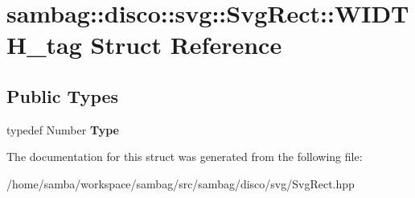 \hypertarget{structsambag_1_1disco_1_1svg_1_1_svg_rect_1_1_w_i_d_t_h__tag}{
\section{sambag::disco::svg::SvgRect::WIDTH\_\-tag Struct Reference}
\label{structsambag_1_1disco_1_1svg_1_1_svg_rect_1_1_w_i_d_t_h__tag}
}
\subsection*{Public Types}
\begin{DoxyCompactItemize}
\item 
\hypertarget{structsambag_1_1disco_1_1svg_1_1_svg_rect_1_1_w_i_d_t_h__tag_acd340385d4aaca2bf015edb751d585cd}{
typedef Number {\bfseries Type}}
\label{structsambag_1_1disco_1_1svg_1_1_svg_rect_1_1_w_i_d_t_h__tag_acd340385d4aaca2bf015edb751d585cd}

\end{DoxyCompactItemize}


The documentation for this struct was generated from the following file:\begin{DoxyCompactItemize}
\item 
/home/samba/workspace/sambag/src/sambag/disco/svg/SvgRect.hpp\end{DoxyCompactItemize}
